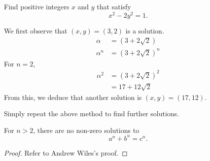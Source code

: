 \begin{exercise}
Find positive integers $x$ and $y$ that satisfy
\[x^2-2y^2=1.\] 
\end{exercise}

\begin{solution}
We first observe that $(x,y)=(3,2)$ is a solution.
\begin{align*}
\alpha &= (3+2\sqrt{2}) \\
\alpha^n &= (3+2\sqrt{2})^n
\end{align*}
For $n=2$,
\begin{align*}
\alpha^2 &= (3+2\sqrt{2})^2 \\&= 17 + 12\sqrt{2}
\end{align*}
From this, we deduce that another solution is $(x,y)=(17,12)$.

Simply repeat the above method to find further solutions.
\end{solution}

\begin{theorem}
For $n>2$, there are no non-zero solutions to 
\[a^n+b^n=c^n.\]
\end{theorem}

\begin{proof}
Refer to Andrew Wiles's proof.
\end{proof}